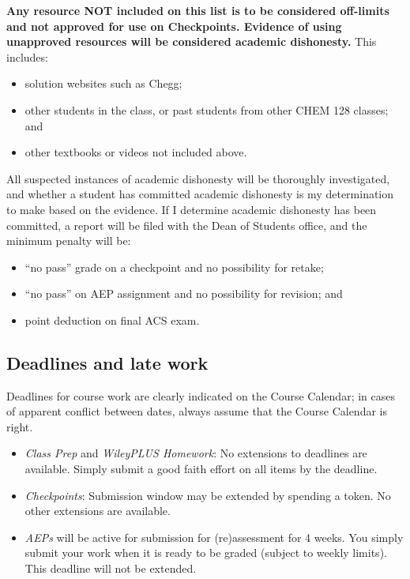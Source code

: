 \textbf{Any resource NOT included on this list is to be considered
off-limits and not approved for use on Checkpoints. Evidence of using
unapproved resources will be considered academic dishonesty.} This
includes:

\begin{itemize}
\tightlist
\item
  solution websites such as Chegg;
\item
  other students in the class, or past students from other CHEM 128
  classes; and
\item
  other textbooks or videos not included above.
\end{itemize}

All suspected instances of academic dishonesty will be thoroughly
investigated, and whether a student has committed academic dishonesty is
my determination to make based on the evidence. If I determine academic
dishonesty has been committed, a report will be filed with the Dean of
Students office, and the minimum penalty will be:

\begin{itemize}
\tightlist
\item
  ``no pass'' grade on a checkpoint and no possibility for retake;
\item
  ``no pass'' on AEP assignment and no possibility for revision; and
\item
  point deduction on final ACS exam.
\end{itemize}

\hypertarget{deadlines-and-late-work}{%
\subsection{Deadlines and late work}\label{deadlines-and-late-work}}

Deadlines for course work are clearly indicated on the Course Calendar;
in cases of apparent conflict between dates, always assume that the
Course Calendar is right.

\begin{itemize}
\tightlist
\item
  \emph{Class Prep} and \emph{WileyPLUS Homework}: No extensions to
  deadlines are available. Simply submit a good faith effort on all
  items by the deadline.
\item
  \emph{Checkpoints}: Submission window may be extended by spending a
  token. No other extensions are available.
\item
  \emph{AEPs} will be active for submission for (re)assessment for 4
  weeks. You simply submit your work when it is ready to be graded
  (subject to weekly limits). This deadline will not be extended.
\end{itemize}

